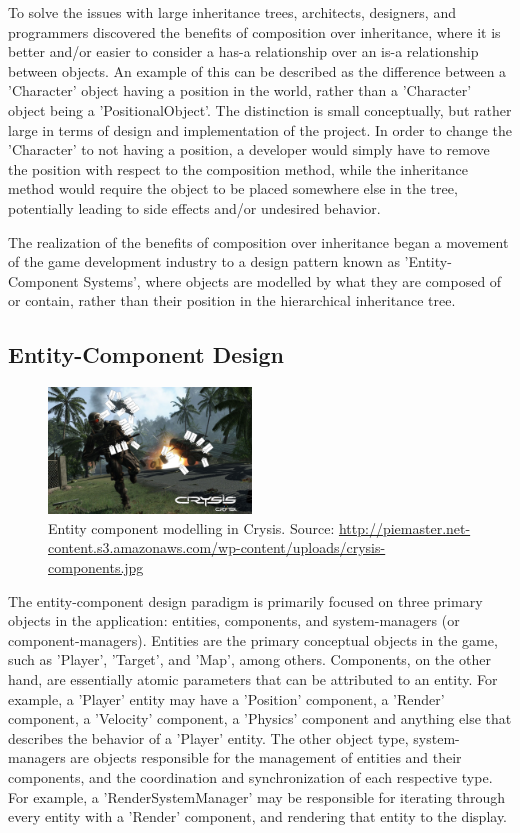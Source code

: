 To solve the issues with large inheritance trees, architects, designers, and programmers discovered\cite{haller2002generic} the benefits of composition over inheritance, where it is better and/or easier to consider a has-a relationship over an is-a relationship between objects. An example of this can be described as the difference between a 'Character' object having a position in the world, rather than a 'Character' object being a 'PositionalObject'. The distinction is small conceptually, but rather large in terms of design and implementation of the project. In order to change the 'Character' to not having a position, a developer would simply have to remove the position with respect to the composition method, while the inheritance method would require the object to be placed somewhere else in the tree, potentially leading to side effects and/or undesired behavior.

The realization of the benefits of composition over inheritance began a movement of the game development industry to a design pattern known as 'Entity-Component Systems', where objects are modelled by what they are composed of or contain, rather than their position in the hierarchical inheritance tree.

\subsection{Entity-Component Design}

\begin{figure}[!ht]
  \centering \includegraphics[width=0.48\textwidth]{Images/crysis-components.jpg}
	\caption{Entity component modelling in Crysis. Source: \url{http://piemaster.net-content.s3.amazonaws.com/wp-content/uploads/crysis-components.jpg}}
\end{figure}

The entity-component design paradigm is primarily focused on three primary objects in the application: entities, components, and system-managers (or component-managers). Entities are the primary conceptual objects in the game, such as 'Player', 'Target', and 'Map', among others. Components, on the other hand, are essentially atomic parameters that can be attributed to an entity. For example, a 'Player' entity may have a 'Position' component, a 'Render' component, a 'Velocity' component, a 'Physics' component and anything else that describes the behavior of a 'Player' entity. The other object type, system-managers are objects responsible for the management of entities and their components, and the coordination and synchronization of each respective type. For example, a 'RenderSystemManager' may be responsible for iterating through every entity with a 'Render' component, and rendering that entity to the display.

